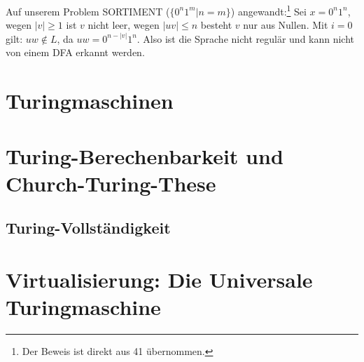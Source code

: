 Auf unserem Problem SORTIMENT ($\{0^n1^m|n=m\}$) angewandt:\footnote{Der Beweis ist direkt aus \cite{schoening} 41 übernommen.}
Sei $x = 0^n1^n$, wegen $|v| \geq 1$ ist $v$ nicht leer,
wegen $|uv| \leq n$ besteht $v$ nur aus Nullen.
Mit $i = 0$ gilt: $uw \notin L$, da $uw = 0^{n-|v|}1^n$.
Also ist die Sprache nicht regulär und kann nicht von einem DFA erkannt werden.


\section{Turingmaschinen}
\section{Turing-Berechenbarkeit und Church-Turing-These}
\subsection{Turing-Vollständigkeit}\label{turingVollstaendigkeit}
\section{Virtualisierung: Die Universale Turingmaschine}
